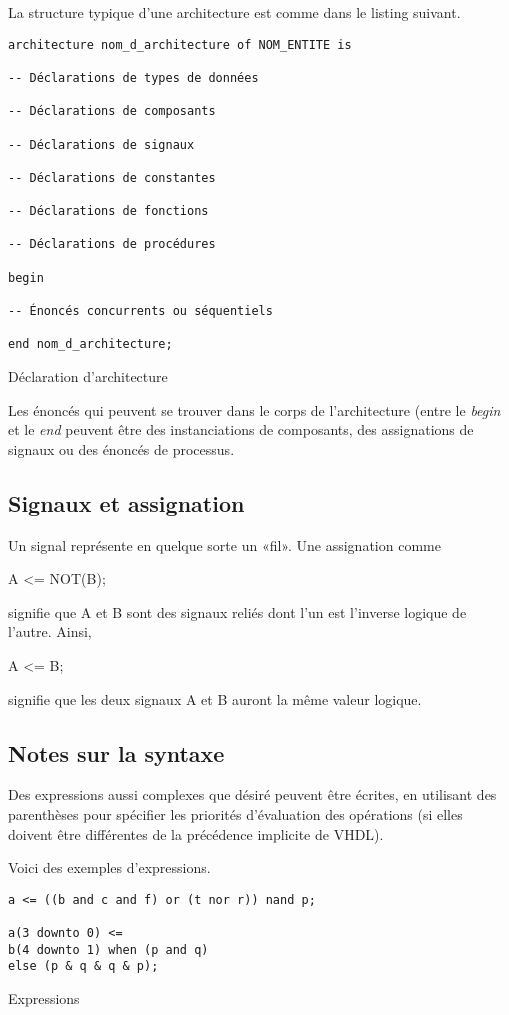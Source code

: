 \documentclass[11pt]{article}
\begin{document}
La structure typique d'une architecture est comme dans le listing suivant.

\begin{listing}[htbp]
\begin{verbatim}
architecture nom_d_architecture of NOM_ENTITE is

-- Déclarations de types de données

-- Déclarations de composants

-- Déclarations de signaux

-- Déclarations de constantes

-- Déclarations de fonctions

-- Déclarations de procédures

begin

-- Énoncés concurrents ou séquentiels

end nom_d_architecture;
\end{verbatim}
\caption{Déclaration d'architecture}
\end{listing}

Les énoncés qui peuvent se trouver dans le corps de l'architecture
(entre le \emph{begin} et le \emph{end} peuvent être des instanciations de
composants, des assignations de signaux ou des énoncés de processus.

\subsection{Signaux et assignation}
\label{sec:org80c6b08}

Un signal représente en quelque sorte un «fil». Une assignation comme

A <= NOT(B);

signifie que A et B sont des signaux reliés dont l'un est l'inverse
logique de l'autre.  Ainsi,

A <= B; 

signifie que les deux signaux A et B auront la même valeur logique.

\subsection{Notes sur la syntaxe}
\label{sec:orgbadb2c3}

Des expressions aussi complexes que désiré peuvent être écrites, en
utilisant des parenthèses pour spécifier les priorités d'évaluation
des opérations (si elles doivent être différentes de la précédence
implicite de VHDL).

Voici des exemples d'expressions.
\begin{listing}[htbp]
\begin{verbatim}
a <= ((b and c and f) or (t nor r)) nand p;

a(3 downto 0) <=
b(4 downto 1) when (p and q)
else (p & q & q & p);
\end{verbatim}
\caption{Expressions}
\end{listing}
\end{document}
